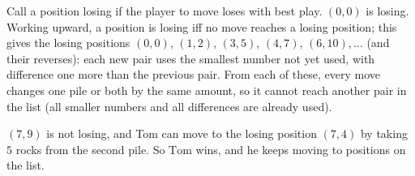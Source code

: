 Call a position losing if the player to move loses with best play. $(0,0)$ is losing. Working upward, a position is losing iff no move reaches a losing position; this gives the losing positions $(0,0)$, $(1,2)$, $(3,5)$, $(4,7)$, $(6,10),\dots$ (and their reverses): each new pair uses the smallest number not yet used, with difference one more than the previous pair. From each of these, every move changes one pile or both by the same amount, so it cannot reach another pair in the list (all smaller numbers and all differences are already used).

$(7,9)$ is not losing, and Tom can move to the losing position $(7,4)$ by taking $5$ rocks from the second pile. So $\boxed{\text{Tom}}$ wins, and he keeps moving to positions on the list.
